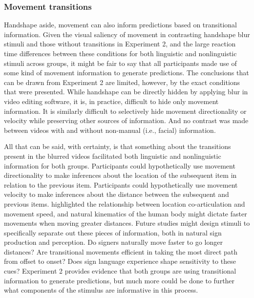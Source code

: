         \subsubsection{Movement transitions}
            Handshape aside, movement can also inform predictions based on transitional information. Given the visual saliency of movement in contrasting handshape blur stimuli and those without transitions in Experiment 2, and the large reaction time differences between these conditions for both linguistic and nonlinguistic stimuli across groups, it might be fair to say that all participants made use of some kind of movement information to generate predictions. The conclusions that can be drawn from Experiment 2 are limited, however, by the exact conditions that were presented. While handshape can be directly hidden by applying blur in video editing software, it is, in practice, difficult to hide only movement information. It is similarly difficult to selectively hide movement directionality or velocity while preserving other sources of information. And no contrast was made between videos with and without non-manual (i.e., facial) information. \par
            All that can be said, with certainty, is that something about the transitions present in the blurred videos facilitated both linguistic and nonlinguistic information for both groups. Participants could hypothetically use movement directionality to make inferences about the location of the subsequent item in relation to the previous item. Participants could hypothetically use movement velocity to make inferences about the distance between the subsequent and previous items.  highlighted the relationship between location co-articulation and movement speed, and natural kinematics of the human body might dictate faster movements when moving greater distances. Future studies might design stimuli to specifically separate out these pieces of information, both in natural sign production and perception. Do signers naturally move faster to go longer distances? Are transitional movements efficient in taking the most direct path from offset to onset? Does sign language experience shape sensitivity to these cues? Experiment 2 provides evidence that both groups are using transitional information to generate predictions, but much more could be done to further what components of the stimulus are informative in this process. \par
